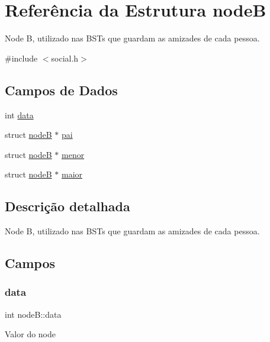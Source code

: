 \hypertarget{structnodeB}{}\section{Referência da Estrutura nodeB}
\label{structnodeB}


Node B, utilizado nas B\+S\+Ts que guardam as amizades de cada pessoa.  




{\ttfamily \#include $<$social.\+h$>$}

\subsection*{Campos de Dados}
\begin{DoxyCompactItemize}
\item 
int \mbox{\hyperlink{structnodeB_a77629c0a64c8d9c973500956426a3839}{data}}
\item 
struct \mbox{\hyperlink{structnodeB}{nodeB}} $\ast$ \mbox{\hyperlink{structnodeB_a8b1942214da0ec30a911d3d8f1b2f142}{pai}}
\item 
struct \mbox{\hyperlink{structnodeB}{nodeB}} $\ast$ \mbox{\hyperlink{structnodeB_a433b5c01c13cba63ca218f887ce3fef7}{menor}}
\item 
struct \mbox{\hyperlink{structnodeB}{nodeB}} $\ast$ \mbox{\hyperlink{structnodeB_a8c430943b45eba8b8ddb4007b0ed4d2c}{maior}}
\end{DoxyCompactItemize}


\subsection{Descrição detalhada}
Node B, utilizado nas B\+S\+Ts que guardam as amizades de cada pessoa. 

\subsection{Campos}
\mbox{\label{structnodeB_a77629c0a64c8d9c973500956426a3839}} 
\subsubsection{\texorpdfstring{data}{data}}
{\footnotesize\ttfamily int node\+B\+::data}

Valor do node \mbox{\label{structnodeB_a8b1942214da0ec30a911d3d8f1b2f142}} 

